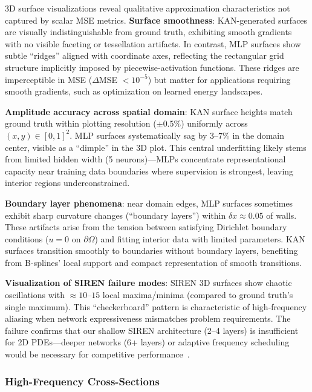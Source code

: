 \documentclass[11pt,a4paper]{article}
\begin{document}
3D surface visualizations reveal qualitative approximation characteristics not captured by scalar MSE metrics. \textbf{Surface smoothness}: KAN-generated surfaces are visually indistinguishable from ground truth, exhibiting smooth gradients with no visible faceting or tessellation artifacts. In contrast, MLP surfaces show subtle ``ridges'' aligned with coordinate axes, reflecting the rectangular grid structure implicitly imposed by piecewise-activation functions. These ridges are imperceptible in MSE ($\Delta$MSE $< 10^{-5}$) but matter for applications requiring smooth gradients, such as optimization on learned energy landscapes.

\textbf{Amplitude accuracy across spatial domain}: KAN surface heights match ground truth within plotting resolution ($\pm 0.5\%$) uniformly across $(x,y) \in [0,1]^2$. MLP surfaces systematically sag by $3$--$7\%$ in the domain center, visible as a ``dimple'' in the 3D plot. This central underfitting likely stems from limited hidden width (5 neurons)—MLPs concentrate representational capacity near training data boundaries where supervision is strongest, leaving interior regions underconstrained.

\textbf{Boundary layer phenomena}: near domain edges, MLP surfaces sometimes exhibit sharp curvature changes (``boundary layers'') within $\delta x \approx 0.05$ of walls. These artifacts arise from the tension between satisfying Dirichlet boundary conditions ($u=0$ on $\partial\Omega$) and fitting interior data with limited parameters. KAN surfaces transition smoothly to boundaries without boundary layers, benefiting from B-splines' local support and compact representation of smooth transitions.

\textbf{Visualization of SIREN failure modes}: SIREN 3D surfaces show chaotic oscillations with $\approx 10$--$15$ local maxima/minima (compared to ground truth's single maximum). This ``checkerboard'' pattern is characteristic of high-frequency aliasing when network expressiveness mismatches problem requirements. The failure confirms that our shallow SIREN architecture (2--4 layers) is insufficient for 2D PDEs—deeper networks (6+ layers) or adaptive frequency scheduling would be necessary for competitive performance~\citep{sitzmann2020implicit}.

\subsubsection{High-Frequency Cross-Sections}
\end{document}

